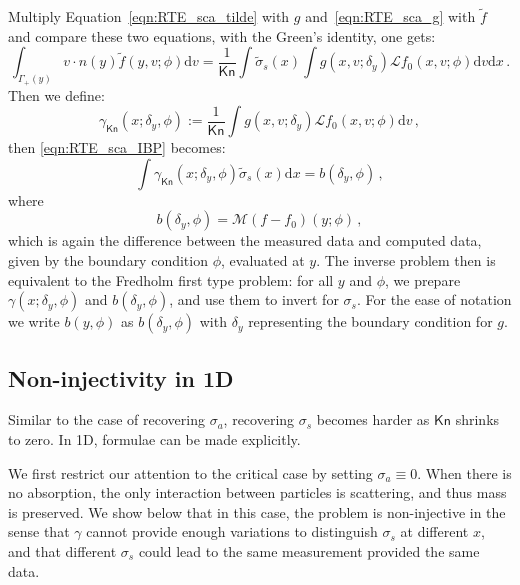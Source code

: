 \documentclass[english,reqno]{amsart}
\theoremstyle{plain}
\theoremstyle{definition} %
\newcommand{\rd}{\mathrm{d}}
\newcommand{\Kn}{\mathsf{Kn}}
\begin{document}
Multiply Equation~\eqref{eqn:RTE_sca_tilde} with $g$ and~\eqref{eqn:RTE_sca_g} with $\tilde{f}$ and compare these two equations, with the Green's identity, one gets:
\begin{equation}\label{eqn:RTE_sca_IBP}
\int_{\Gamma_+(y)} v\cdot n(y) \tilde{f}(y,v;\phi)\rd v=\frac{1}{\Kn} \int \tilde{\sigma}_s(x)\int g(x,v; \delta_y)\mathcal{L}f_0(x,v;\phi) \rd v\rd x\,.
\end{equation}
Then we define:
\begin{equation}\label{eqn:gamma-sca-crit}
\gamma_\Kn(x; \delta_y,\phi):= \frac{1}{\Kn}\int g(x,v; \delta_y)\mathcal{L}f_0(x,v;\phi)\rd{v}\,,
\end{equation}
then \eqref{eqn:RTE_sca_IBP} becomes:
\begin{equation}\label{eqn:A_critical}
 \int \gamma_\Kn (x;\delta_y,\phi)\tilde{\sigma}_s(x) \rd{x}=b(\delta_y,\phi)\,,
\end{equation}
where
\begin{equation*}
b(\delta_y, \phi) = \mathcal{M}(f-f_0)(y;\phi)\,,
\end{equation*}
which is again the difference between the measured data and computed data, given by the boundary condition $\phi$, evaluated at $y$. The inverse problem then is equivalent to the Fredholm first type problem: for all $y$ and $\phi$, we prepare $\gamma(x;\delta_y,\phi)$ and $b(\delta_y,\phi)$, and use them to invert for $\sigma_s$. For the ease of notation we write $b(y,\phi)$ as $b(\delta_y,\phi)$ with $\delta_y$ representing the boundary condition for $g$.



\subsection{Non-injectivity in 1D}
Similar to the case of recovering $\sigma_a$, recovering $\sigma_s$ becomes harder as $\Kn$ shrinks to zero. In 1D, formulae can be made explicitly.

We first restrict our attention to the critical case by setting $\sigma_a \equiv 0$. When there is no absorption, the only interaction between particles is scattering, and thus mass is preserved. We show below that in this case, the problem is non-injective in the sense that $\gamma$ cannot provide enough variations to distinguish $\sigma_s$ at different $x$, and that different $\sigma_s$ could lead to the same measurement provided the same data. 
 
\end{document}
